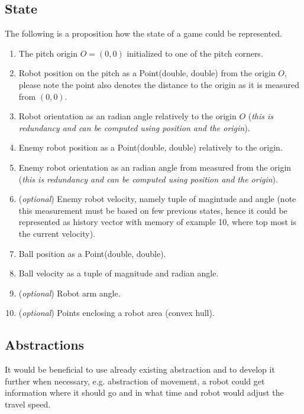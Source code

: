 \documentclass[11pt,a4paper]{article}
\begin{document}
\subsection{State}
The following is a proposition how the state of a game could be represented.
\begin{enumerate}
  \item The pitch origin $O = (0, 0)$ initialized to one of the pitch corners.
  \item Robot position on the pitch as a Point(double, double) from the origin $O$, please note the point also denotes the distance to the origin as it is measured from $(0, 0)$.
  \item Robot orientation as an radian angle relatively to the origin $O$ (\emph{this is redundancy and can be computed using position and the origin}).
  \item Enemy robot position as a Point(double, double) relatively to the origin.
  \item Enemy robot orientation as an radian angle from measured from the origin (\emph{this is redundancy and can be computed using position and the origin}).
  \item (\emph{optional}) Enemy robot velocity, namely tuple of magintude and angle (note this measurement must be based on few previous states, hence it could be represented as history vector with memory of example 10, where top most is the current velocity).
  \item Ball position as a Point(double, double).
  \item Ball velocity as a tuple of magnitude and radian angle.
  \item (\emph{optional}) Robot arm angle.
  \item (\emph{optional}) Points enclosing a robot area (convex hull).
\end{enumerate}

\subsection{Abstractions}
It would be beneficial to use already existing abstraction and to develop it further when necessary, e.g. abstraction of movement, a robot could get information where it should go and in what time and robot would adjust the travel speed.
\end{document}
